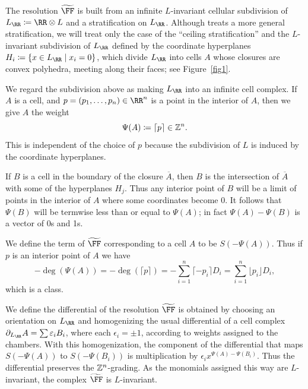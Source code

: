 \documentclass{amsart}
\begin{document}
The resolution $\tF$ is built from an infinite $L$-invariant cellular subdivision of $L_\RR \ce \RR\otimes L$
and a stratification on $L_{\RR}$.  Although \cite{BCS+25} treats a more general stratification, we will
treat only the case of  the ``ceiling stratification'' and the $L$-invariant subdivision of $L_\RR$ defined by the coordinate hyperplanes $H_i \ce \{x\in L_\RR\mid x_i = 0\}$, which divide $L_\RR$ into cells $A$ whose closures are convex polyhedra, meeting along their faces; see Figure~\ref{fig1}.


We regard the subdivision above as making $L_{\RR}$ into an infinite cell complex.
If $A$ is a cell, and $p = (p_1,\dots, p_n) \in \RR^n$ is a point in the
interior of $A$, then we give $A$ the weight 
$$
\Psi(A) \coloneqq \lceil p \rceil \in \mathbb Z^{n}.
$$
This is independent of the choice of $p$ because the subdivision of $L$ is induced by the coordinate hyperplanes.
 
If $B$ is 
a cell in the boundary of the closure $\overline A$, then $B$ is the intersection of
$\overline A$ with some of the hyperplanes $H_{j}$. Thus any interior point of $B$ will
be a limit of points in the interior of $A$ where some coordinates become 0. It follows that
$\Psi(B)$ will be termwise less than or equal to $\Psi(A)$; in fact $\Psi(A) - \Psi(B)$ is a vector
of 0s and 1s.

We define the term of $\tF$ corresponding to a cell $A$  to be $S(-\Psi(A))$. Thus if $p$ is an interior point of $A$
we have
\[
-\deg(\Psi(A)) = -\deg( \lceil {p}\rceil) = -\sum_{i=1}^n\lceil -p_i\rceil D_i=\sum_{i=1}^n\lfloor p_i\rfloor D_i,
\] 
which is a \BT class.

 We define the differential of the resolution $\tF$ is obtained by choosing
an orientation on $L_\RR$ and homogenizing the usual differential of
a cell complex $\partial_{L_{\RR}}A = \sum\epsilon_{i}B_{i}$, where each $\epsilon_{i} = \pm 1$, according to weights assigned to the chambers. With this homogenization, the component of the differential that maps $S(-\Psi(A))$ to $S(-\Psi(B_{i}))$ is multiplication by $\epsilon_{i}x^{\Psi(A) - \Psi(B_{i})}$. Thus the
differential preserves the $\mathbb Z^{n}$-grading. As the monomials assigned this way are $L$-invariant, the complex $\tF$ is $L$-invariant.
\end{document}
